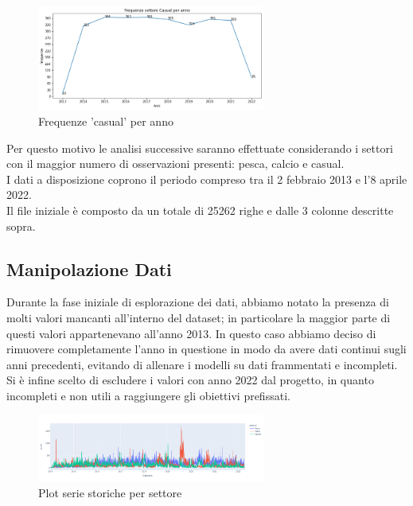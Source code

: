 \documentclass[12pt, a4paper, twocolumn]{article} %
\begin{document}
\begin{figure}[H]
  \caption{Frequenze 'casual' per anno}
  \begin{center}
    \includegraphics[width=75mm,scale=0.5]{frequenze-casual.png}
  \end{center}
\end{figure}

Per questo motivo le analisi successive saranno effettuate considerando i settori con il maggior numero di osservazioni presenti: pesca, calcio e casual.\\
I dati a disposizione coprono il periodo compreso tra il 2 febbraio 2013 e l'8 aprile 2022.\\
Il file iniziale è composto da un totale di 25262 righe e dalle 3 colonne descritte sopra.

\subsection{Manipolazione Dati}
Durante la fase iniziale di esplorazione dei dati, abbiamo notato la presenza di molti valori mancanti all'interno del dataset; in particolare la maggior parte di questi valori appartenevano all'anno 2013. In questo caso abbiamo deciso di rimuovere completamente l'anno in questione in modo da avere dati continui sugli anni precedenti, evitando di allenare i modelli su dati frammentati e incompleti.\\
Si è infine scelto di escludere i valori con anno 2022 dal progetto, in quanto incompleti e non utili a raggiungere gli obiettivi prefissati.
\begin{figure}[H]
  \caption{Plot serie storiche per settore}
  \begin{center}
    \includegraphics[width=75mm,scale=0.5]{plot_dati_settori.png}
  \end{center}
\end{figure}
\end{document}
